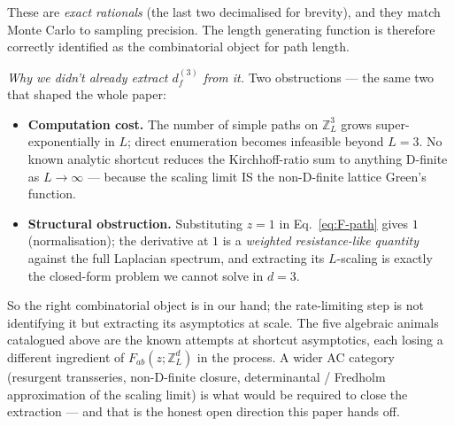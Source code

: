 \documentclass[10pt,a4paper,twocolumn]{article}
\theoremstyle{plain}
\theoremstyle{definition}
\begin{document}
These are \emph{exact rationals} (the last two decimalised for
brevity), and they match Monte Carlo to sampling precision.
The length generating function is therefore correctly identified
as the combinatorial object for path length.

\emph{Why we didn't already extract $d_f^{(3)}$ from it.}
Two obstructions --- the same two that shaped the whole paper:
\begin{itemize}[leftmargin=*]
\item \textbf{Computation cost.}  The number of simple paths on
  $\mathbb{Z}^3_L$ grows super-exponentially in $L$; direct
  enumeration becomes infeasible beyond $L = 3$.  No known
  analytic shortcut reduces the Kirchhoff-ratio sum to anything
  D-finite as $L \to \infty$ --- because the scaling limit IS the
  non-D-finite lattice Green's function.
\item \textbf{Structural obstruction.}  Substituting
  $z = 1$ in Eq.~\eqref{eq:F-path} gives $1$ (normalisation); the
  derivative at $1$ is a \emph{weighted resistance-like quantity}
  against the full Laplacian spectrum, and extracting its
  $L$-scaling is exactly the closed-form problem we cannot solve
  in $d = 3$.
\end{itemize}

So the right combinatorial object is in our hand; the
rate-limiting step is not identifying it but extracting
its asymptotics at scale.  The five algebraic animals catalogued
above are the known attempts at shortcut asymptotics, each
losing a different ingredient of $F_{ab}(z; \mathbb{Z}^d_L)$ in
the process.  A wider AC category (resurgent transseries,
non-D-finite closure, determinantal / Fredholm approximation of
the scaling limit) is what would be required to close the
extraction --- and that is the honest open direction this paper
hands off.
\end{document}
